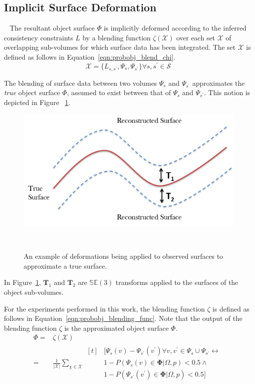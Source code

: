 \subsection{Implicit Surface Deformation}
~\label{subsec:probobj_implicit_surface_deform}
The resultant object surface \( \Phi \) is implicitly deformed according to the 
inferred consistency constraints \( L \) by a blending function \( \zeta(\mathcal{X}) \) 
over each set \( \mathcal{X} \) of overlapping sub-volumes for which surface data has been integrated.
The set \( \mathcal{X} \) is defined as follows in Equation~\ref{eqn:probobj_blend_chi}.
\begin{equation}
  \label{eqn:probobj_blend_chi}
  \mathcal{X} = \Big \{ 
    L_{s, s^{'}}, \Psi_{s}, \Psi_{s^{'}} 
  \Big \}
  \forall s, s^{'} \in \mathcal{S}
\end{equation}

The blending of surface data between two volumes \( \Psi_{s} \) and \( \Psi_{s^{'}} \) 
approximates the \textit{true} object surface \( \Phi \), assumed to exist between that of 
\( \Psi_{s} \) and \( \Psi_{s^{'}} \). This notion is depicted in Figure
~\ref{figure:probobj_implicit_surface}.
\begin{figure}[!htbp]
  \centering
  \includegraphics[width=.6\linewidth]{figures/object_recon/deformation.png}
  \caption[Implicit Surface Deformation]{An example of deformations being applied to observed surfaces 
  to approximate a true surface.}
~\label{figure:probobj_implicit_surface}
\end{figure}
In Figure~\ref{figure:probobj_implicit_surface}, \( \bm{T}_{1} \) and \( \bm{T}_{2} \) are 
\( \mathbb{SE}(3) \) transforms applied to the surfaces of the object sub-volumes.

For the experiments performed in this work, the blending function \( \zeta \) is defined as follows in 
Equation~\ref{eqn:probobj_blending_func}. Note that the output of the blending function \( \zeta \) is 
the approximated object surface \( \Phi \).
\begin{align}
  \label{eqn:probobj_blending_func}
  \Phi ={}& \zeta(\mathcal{X}) \\
  ={}&
  \frac{1}{\left| \mathcal{X} \right|} \sum_{\chi \in \mathcal{X}} 
    \begin{aligned}[t]
      {}& \Big[ 
        \Psi_{s}(v) - \Psi_{s^{'}}(v^{'})
        \forall v, v^{'} \in \Psi_{s} \cup \Psi_{s^{'}}
        \leftrightarrow \\ 
      {}& 1 - P(\Psi_{s}(v) \in \mathbf{\Phi} | \Omega, p) < 0.5 \wedge \\
      {}& 1 - P(\Psi_{s^{'}}(v^{'}) \in \mathbf{\Phi} | \Omega, p) < 0.5
      \Big]
    \end{aligned}
\end{align}

